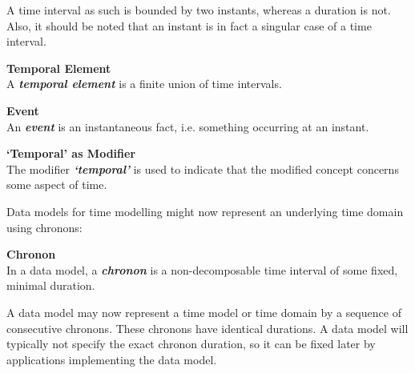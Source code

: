 A time interval as such is bounded by two instants, whereas a duration is not. Also, it should be noted that an instant is in fact a singular case of a time interval. 

\begin{svgraybox}
\vspace{-10pt}
\begin{definition}\textbf{Temporal Element}~\cite{Dyreson1994}\\
A \emph{\textbf{temporal element}} is a finite union of time intervals.
\end{definition}

\begin{definition}\textbf{Event}~\cite{Dyreson1994}\\
An \emph{\textbf{event}} is an instantaneous fact, i.e. something occurring at an instant.
\end{definition}

\begin{definition}\textbf{`Temporal' as Modifier}~\cite{Dyreson1994}\\
The modifier \emph{\textbf{`temporal'}} is used to indicate that the modified concept concerns some aspect of time.
\end{definition}
\vspace{-10pt}
\end{svgraybox}


Data models for time modelling might now represent an underlying time domain using chronons:

\begin{svgraybox}
\vspace{-10pt}
\begin{definition}\textbf{Chronon}~\cite{Dyreson1994}\\
In a data model, a \emph{\textbf{chronon}} is a non-decomposable time interval of some fixed, minimal duration.
\end{definition}
\vspace{-10pt}
\end{svgraybox}

A data model may now represent a time model or time domain by a sequence of consecutive chronons. These chronons have identical durations. A data model will typically not specify the exact chronon duration, so it can be fixed later by applications implementing the data model.

